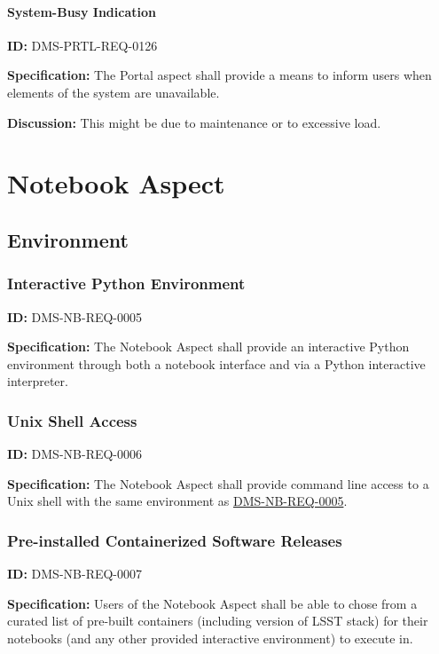 \documentclass[SE,toc,lsstdraft]{lsstdoc}
\begin{document}
\paragraph{System-Busy Indication}\hfill  %

\label{DMS-PRTL-REQ-0126}
\textbf{ID:} DMS-PRTL-REQ-0126

\textbf{Specification:}
The Portal aspect shall provide a means to inform users when elements of the system are unavailable.

\textbf{Discussion:}
This might be due to maintenance or to excessive load.

\section{Notebook Aspect}

\subsection{Environment}

\subsubsection{Interactive Python Environment}

\label{DMS-NB-REQ-0005}
\textbf{ID:} DMS-NB-REQ-0005

\textbf{Specification:}
The Notebook Aspect shall provide an interactive Python environment through both a notebook interface and via a Python interactive interpreter.

\subsubsection{Unix Shell Access}

\label{DMS-NB-REQ-0006}
\textbf{ID:} DMS-NB-REQ-0006

\textbf{Specification:}
The Notebook Aspect shall provide command line access to a Unix shell with the same environment as \hyperref[DMS-NB-REQ-0005]{DMS-NB-REQ-0005}.

\subsubsection{Pre-installed Containerized Software Releases}

\label{DMS-NB-REQ-0007}
\textbf{ID:} DMS-NB-REQ-0007

\textbf{Specification:}
Users of the Notebook Aspect shall be able to chose from a curated list of pre-built containers (including version of LSST stack) for their notebooks (and any other provided interactive environment) to execute in.
\end{document}

